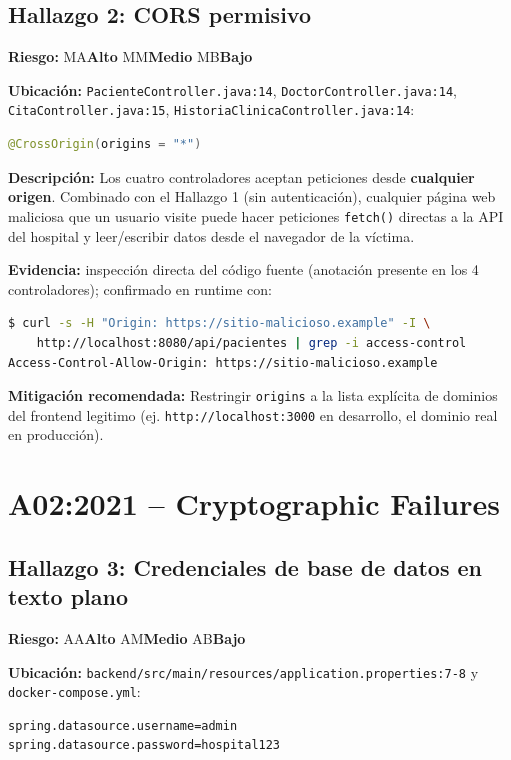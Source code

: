 \documentclass[11pt,a4paper]{article}
\newcommand{\riesgo}[1]{%
  \ifx#1A\textcolor{riesgoAlto}{\textbf{Alto}}\fi
  \ifx#1M\textcolor{riesgoMedio}{\textbf{Medio}}\fi
  \ifx#1B\textcolor{riesgoBajo}{\textbf{Bajo}}\fi
}
\begin{document}
\subsection{Hallazgo 2: CORS permisivo}
\textbf{Riesgo:} \riesgo{M}

\textbf{Ubicaci\'on:} \texttt{PacienteController.java:14},
\texttt{DoctorController.java:14}, \texttt{CitaController.java:15},
\texttt{HistoriaClinicaController.java:14}:
\begin{lstlisting}[language=java]
@CrossOrigin(origins = "*")
\end{lstlisting}

\textbf{Descripci\'on:} Los cuatro controladores aceptan peticiones desde
\textbf{cualquier origen}. Combinado con el Hallazgo 1 (sin autenticaci\'on),
cualquier p\'agina web maliciosa que un usuario visite puede hacer peticiones
\texttt{fetch()} directas a la API del hospital y leer/escribir datos desde el
navegador de la v\'ictima.

\textbf{Evidencia:} inspecci\'on directa del c\'odigo fuente (anotaci\'on
presente en los 4 controladores); confirmado en runtime con:
\begin{lstlisting}[language=bash]
$ curl -s -H "Origin: https://sitio-malicioso.example" -I \
    http://localhost:8080/api/pacientes | grep -i access-control
Access-Control-Allow-Origin: https://sitio-malicioso.example
\end{lstlisting}

\textbf{Mitigaci\'on recomendada:} Restringir \texttt{origins} a la lista
expl\'icita de dominios del frontend legitimo (ej. \texttt{http://localhost:3000}
en desarrollo, el dominio real en producci\'on).

\newpage
\section{A02:2021 -- Cryptographic Failures}

\subsection{Hallazgo 3: Credenciales de base de datos en texto plano}
\textbf{Riesgo:} \riesgo{A}

\textbf{Ubicaci\'on:} \texttt{backend/src/main/resources/application.properties:7-8}
y \texttt{docker-compose.yml}:
\begin{lstlisting}
spring.datasource.username=admin
spring.datasource.password=hospital123
\end{lstlisting}
\end{document}
